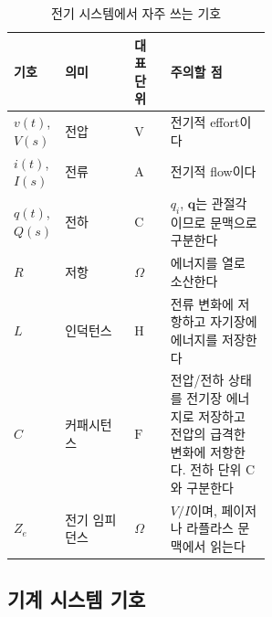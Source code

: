 \begin{table}[H]
  \centering
  \caption{전기 시스템에서 자주 쓰는 기호}
  \small
  \setlength{\tabcolsep}{4pt}
  \begin{tabularx}{\linewidth}{@{}>{\raggedright\arraybackslash}p{0.15\linewidth}>{\raggedright\arraybackslash}p{0.27\linewidth}>{\raggedright\arraybackslash}p{0.14\linewidth}>{\raggedright\arraybackslash}X@{}}
    \toprule
    기호 & 의미 & 대표 단위 & 주의할 점 \\
    \midrule
    $v(t)$, $V(s)$ & 전압 & $\mathrm{V}$ & 전기적 effort이다 \\
    $i(t)$, $I(s)$ & 전류 & $\mathrm{A}$ & 전기적 flow이다 \\
    $q(t)$, $Q(s)$ & 전하 & $\mathrm{C}$ & $q_i$, $\bm{q}$는 관절각이므로 문맥으로 구분한다 \\
    $R$ & 저항 & $\Omega$ & 에너지를 열로 소산한다 \\
    $L$ & 인덕턴스 & $\mathrm{H}$ & 전류 변화에 저항하고 자기장에 에너지를 저장한다 \\
    $C$ & 커패시턴스 & $\mathrm{F}$ & 전압/전하 상태를 전기장 에너지로 저장하고 전압의 급격한 변화에 저항한다. 전하 단위 $\mathrm{C}$와 구분한다 \\
    $Z_e$ & 전기 임피던스 & $\Omega$ & $V/I$이며, 페이저나 라플라스 문맥에서 읽는다 \\
    \bottomrule
  \end{tabularx}
\end{table}

\subsection{기계 시스템 기호}

